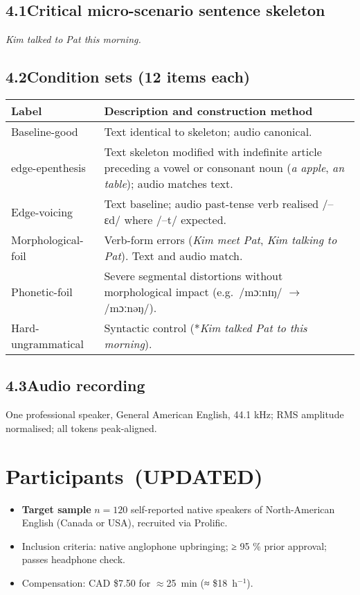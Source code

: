 \documentclass[12pt]{article}
\begin{document}
\subsection{4.1\quad Critical micro-scenario sentence skeleton}
\textit{Kim talked to Pat this morning.}

\subsection{4.2\quad Condition sets (12 items each)}
\begin{center}
\begin{tabular}{@{}lp{10cm}@{}}
\toprule
\textbf{Label} & \textbf{Description and construction method}\\
\midrule
Baseline-good & Text identical to skeleton; audio canonical.\\
edge-epenthesis & Text skeleton modified with indefinite article preceding a vowel or consonant noun (\textit{a apple}, \textit{an table}); audio matches text.\\
Edge-voicing & Text baseline; audio past-tense verb realised /–ɛd/ where /–t/ expected.\\
Morphological-foil & Verb-form errors (\textit{Kim \;meet \;Pat}, \textit{Kim talking to Pat}). Text and audio match.\\
Phonetic-foil & Severe segmental distortions without morphological impact (e.g.\ /mɔːnɪŋ/ $\rightarrow$ /mɔːnəŋ/).\\
Hard-ungrammatical & Syntactic control (*\textit{Kim talked Pat to this morning}).\\
\bottomrule
\end{tabular}
\end{center}

\subsection{4.3\quad Audio recording}
One professional speaker, General American English, 44.1 kHz; RMS amplitude normalised; all tokens peak-aligned.

\section{Participants \,(UPDATED)}
\begin{itemize}
  \item \textbf{Target sample} $n=120$ self-reported native speakers of North-American English (Canada or USA), recruited via Prolific.
  \item Inclusion criteria: native anglophone upbringing; ≥ 95 \% prior approval; passes headphone check.
  \item Compensation: CAD \$7.50 for $\approx$25~min (≈ \$18~h$^{-1}$).
\end{itemize}
\end{document}
